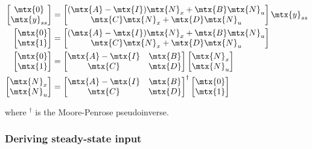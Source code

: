 \begin{align*}
  \begin{bmatrix}
    \mtx{0} \\
    \mtx{y}_{ss}
  \end{bmatrix} &=
  \begin{bmatrix}
    (\mtx{A} - \mtx{I})\mtx{N}_x + \mtx{B}\mtx{N}_u \\
    \mtx{C}\mtx{N}_x + \mtx{D}\mtx{N}_u
  \end{bmatrix}
  \mtx{y}_{ss} \\
  \begin{bmatrix}
    \mtx{0} \\
    \mtx{1}
  \end{bmatrix} &=
  \begin{bmatrix}
    (\mtx{A} - \mtx{I})\mtx{N}_x + \mtx{B}\mtx{N}_u \\
    \mtx{C}\mtx{N}_x + \mtx{D}\mtx{N}_u
  \end{bmatrix} \\
  \begin{bmatrix}
    \mtx{0} \\
    \mtx{1}
  \end{bmatrix} &=
  \begin{bmatrix}
    \mtx{A} - \mtx{I} & \mtx{B} \\
    \mtx{C} & \mtx{D}
  \end{bmatrix}
  \begin{bmatrix}
    \mtx{N}_x \\
    \mtx{N}_u
  \end{bmatrix} \\
  \begin{bmatrix}
    \mtx{N}_x \\
    \mtx{N}_u
  \end{bmatrix} &=
  \begin{bmatrix}
    \mtx{A} - \mtx{I} & \mtx{B} \\
    \mtx{C} & \mtx{D}
  \end{bmatrix}^{\dagger}
  \begin{bmatrix}
    \mtx{0} \\
    \mtx{1}
  \end{bmatrix}
\end{align*}

where $^\dagger$ is the Moore-Penrose pseudoinverse.

\subsubsection{Deriving steady-state input}


